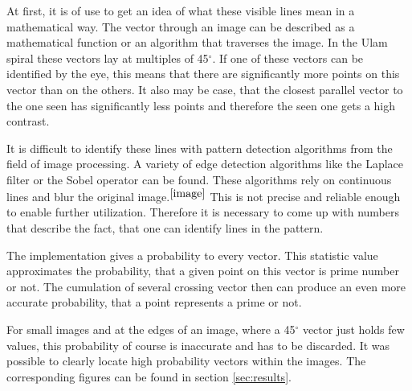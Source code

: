 At first, it is of use to get an idea of what these visible lines mean in a mathematical way. The vector through an image can be described as a mathematical function or an algorithm that traverses the image. In the Ulam spiral these vectors lay at multiples of 45$^\circ$.
If one of these vectors can be identified by the eye, this means that there are significantly more points on this vector than on the others. It also may be case, that the closest parallel vector to the one seen has significantly less points and therefore the seen one gets a high contrast.

It is difficult to identify these lines with pattern detection algorithms from the field of image processing. A variety of edge detection algorithms like the Laplace filter or the Sobel operator can be found. These algorithms rely on continuous lines and blur the original image.$^{\cite{image}}$ This is not precise and reliable enough to enable further utilization. Therefore it is necessary to come up with numbers that describe the fact, that one can identify lines in the pattern. 

The implementation gives a probability to every vector. This statistic value approximates the probability, that a given point on this vector is prime number or not. The cumulation of several crossing vector then can produce an even more accurate probability, that a point represents a prime or not.

For small images and at the edges of an image, where a 45$^\circ$ vector just holds few values, this probability of course is inaccurate and has to be discarded. It was possible to clearly locate high probability vectors within the images. The corresponding figures can be found in section \ref{sec:results}.

